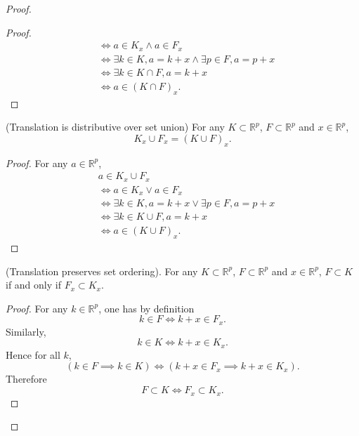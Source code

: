 \begin{enumerate}
\begin{proof}
\begin{lemma}
\begin{proof}
\begin{align*}
			&\iff a \in K_x \land a \in F_x \\
			&\iff \exists k \in K, a = k + x \land  \exists p \in F, a = p + x \\
			&\iff \exists k \in K \cap F, a = k + x \\
			&\iff a \in  (K \cap F)_x
		.\end{align*}
	\end{proof}
	\end{lemma}
\begin{lemma}(Translation is distributive over set union)
		For any $K \subset \mathbb{R}^p$, $F\subset \mathbb{R}^p$ and $x \in \mathbb{R}^p$,\[
			K_x \cup F_x = (K \cup F)_x
		.\] 
	
	\begin{proof}
		For any $a \in \mathbb{R}^p$,
		\begin{align*}
			&a \in K_x \cup F_x \\
			&\iff a \in K_x \lor a \in F_x \\
			&\iff \exists k \in K, a = k + x \lor  \exists p \in F, a = p + x \\
			&\iff \exists k \in K \cup F, a = k + x \\
			&\iff a \in  (K \cup F)_x
		.\end{align*}
	\end{proof}
	\end{lemma}

	
	\begin{lemma}(Translation preserves set ordering).
		For any $K \subset \mathbb{R}^p$, $F\subset \mathbb{R}^p$ and $x \in \mathbb{R}^p$, $F \subset K$ if and only if $F_x \subset K_x$.
	\begin{proof}
		For any $k \in \mathbb{R}^p$, one has by definition \[
			k \in F \iff k+x \in F_x
		.\] 
		Similarly, \[
			k \in K \iff  k + x \in K_x
		.\] 
		Hence for all $k$, \[
			(k \in F \implies k \in K)
			\iff 
			(k + x \in F_x \implies k+x \in K_x)
		.\] 
		Therefore
		\[
			F\subset K \iff  F_x \subset K_x
		.\] 
	\end{proof}
	\end{lemma}
	
	
	

\end{proof}
\end{enumerate}
